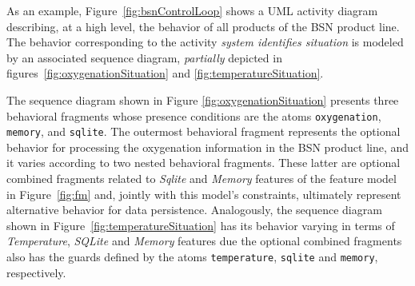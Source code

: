 %   



As an example, Figure~\ref{fig:bsnControlLoop} shows a UML activity diagram
describing, at a high level, the behavior of all products of the BSN product
line.  The behavior corresponding to the activity \textit{system identifies
situation} is modeled by an associated sequence diagram, \emph{partially}
depicted in figures~\ref{fig:oxygenationSituation} and \ref{fig:temperatureSituation}.

The sequence diagram shown in Figure \ref{fig:oxygenationSituation} presents
three behavioral fragments whose presence conditions are  the atoms
\texttt{oxygenation}, \texttt{memory}, and \texttt{sqlite}. The outermost
behavioral fragment represents the optional behavior for processing the
oxygenation information in the BSN product line, and it varies according to two
nested behavioral fragments. These latter are optional combined fragments
related to \textit{Sqlite} and \textit{Memory} features of the feature model in
Figure~\ref{fig:fm} and, jointly with this model's constraints, ultimately
represent alternative behavior for data persistence. Analogously, the sequence
diagram shown in Figure~\ref{fig:temperatureSituation} has its behavior varying
in terms of \emph{Temperature}, \emph{SQLite} and \emph{Memory} features due the optional
combined fragments also has the guards defined by the atoms
\texttt{temperature}, \texttt{sqlite} and \texttt{memory}, respectively. 

